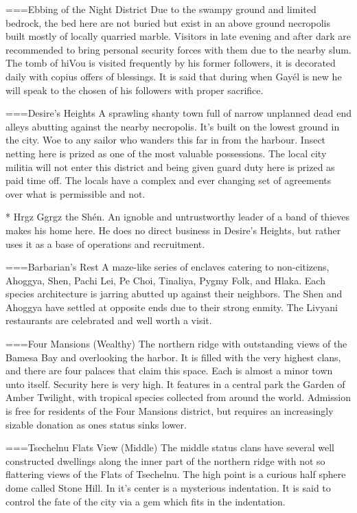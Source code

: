 ===Ebbing of the Night District
Due to the swampy ground and limited bedrock, the bed here are not buried but exist in an above ground necropolis built mostly of locally quarried marble. Visitors in late evening and after dark are recommended to bring personal security forces with them due to the nearby slum. The tomb of hiVou is visited frequently by his former followers, it is decorated daily with copius offers of blessings. It is said that during when Gayél is new he will speak to the chosen of his followers with proper sacrifice.

===Desire's Heights
A sprawling shanty town full of narrow unplanned dead end alleys abutting against the nearby necropolis. It's built on the lowest ground in the city. Woe to any sailor who wanders this far in from the harbour. Insect netting here is prized as one of the most valuable possessions. The local city militia will not enter this district and being given guard duty here is prized as paid time off. The locals have a complex and ever changing set of agreements over what is permissible and not.

* Hrgz Ggrgz the Shén. An ignoble and untrustworthy leader of a band of thieves makes his home here. He does no direct business in Desire's Heights, but rather uses it as a base of operations and recruitment.

===Barbarian's Rest
A maze-like series of enclaves catering to non-citizens, Ahoggya, Shen, Pachi Lei, Pe Choi, Tinaliya, Pygmy Folk, and Hlaka. Each species architecture is jarring abutted up against their neighbors. The Shen and Ahoggya have settled at opposite ends due to their strong enmity. The Livyani restaurants are celebrated and well worth a visit.

===Four Mansions (Wealthy)
The northern ridge with outstanding views of the Bamesa Bay and overlooking the harbor. It is filled with the very highest clans, and there are four palaces that claim this space. Each is almost a minor town unto itself. Security here is very high. It features in a central park the Garden of Amber Twilight, with tropical species collected from around the world. Admission is free for residents of the Four Mansions district, but requires an increasingly sizable donation as ones status sinks lower. 

===Tsechelnu Flats View (Middle)
The middle status clans have several well constructed dwellings along the inner part of the northern ridge with not so flattering views of the Flats of Tsechelnu. The high point is a curious half sphere dome called Stone Hill. In it's center is a mysterious indentation. It is said to control the fate of the city via a gem which fits in the indentation.
  
